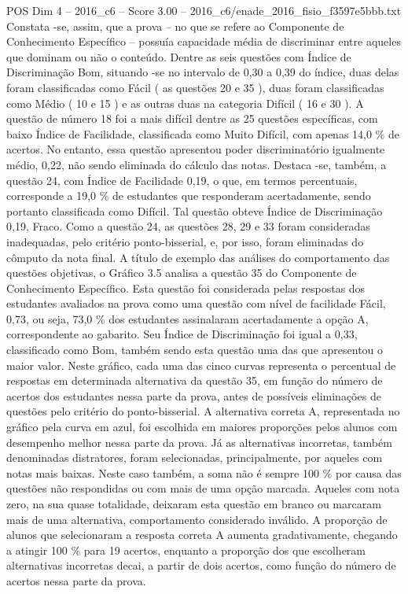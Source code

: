 \begin{textsample}{POS Dim 4 – 2016\_c6 – Score 3.00 – 2016\_c6/enade\_2016\_fisio\_f3597e5bbb.txt}
Constata -se, assim, que a prova – no que se refere ao Componente de Conhecimento Específico – possuía capacidade média de discriminar entre aqueles que dominam ou não o conteúdo.
Dentre as seis questões com Índice de Discriminação Bom, situando -se no intervalo de 0,30 a 0,39 do índice, duas delas foram classificadas como Fácil ( as questões 20 e 35 ), duas foram classificadas como Médio ( 10 e 15 ) e as outras duas na categoria Difícil ( 16 e 30 ).
A questão de número 18 foi a mais difícil dentre as 25 questões específicas, com baixo Índice de Facilidade, classificada como Muito Difícil, com apenas 14,0 \% de acertos.
No entanto, essa questão apresentou poder discriminatório igualmente médio, 0,22, não sendo eliminada do cálculo das notas.
Destaca -se, também, a questão 24, com Índice de Facilidade 0,19, o que, em termos percentuais, corresponde a 19,0 \% de estudantes que responderam acertadamente, sendo portanto classificada como Difícil.
Tal questão obteve Índice de Discriminação 0,19, Fraco.
Como a questão 24, as questões 28, 29 e 33 foram consideradas inadequadas, pelo critério ponto-bisserial, e, por isso, foram eliminadas do cômputo da nota final.
A título de exemplo das análises do comportamento das questões objetivas, o Gráfico 3.5 analisa a questão 35 do Componente de Conhecimento Específico.
Esta questão foi considerada pelas respostas dos estudantes avaliados na prova como uma questão com nível de facilidade Fácil, 0,73, ou seja, 73,0 \% dos estudantes assinalaram acertadamente a opção A, correspondente ao gabarito.
Seu Índice de Discriminação foi igual a 0,33, classificado como Bom, também sendo esta questão uma das que apresentou o maior valor.
Neste gráfico, cada uma das cinco curvas representa o percentual de respostas em determinada alternativa da questão 35, em função do número de acertos dos estudantes nessa parte da prova, antes de possíveis eliminações de questões pelo critério do ponto-bisserial.
A alternativa correta A, representada no gráfico pela curva em azul, foi escolhida em maiores proporções pelos alunos com desempenho melhor nessa parte da prova.
Já as alternativas incorretas, também denominadas distratores, foram selecionadas, principalmente, por aqueles com notas mais baixas.
Neste caso também, a soma não é sempre 100 \% por causa das questões não respondidas ou com mais de uma opção marcada.
Aqueles com nota zero, na sua quase totalidade, deixaram esta questão em branco ou marcaram mais de uma alternativa, comportamento considerado inválido.
A proporção de alunos que selecionaram a resposta correta A aumenta gradativamente, chegando a atingir 100 \% para 19 acertos, enquanto a proporção dos que escolheram alternativas incorretas decai, a partir de dois acertos, como função do número de acertos nessa parte da prova.

\end{textsample}
